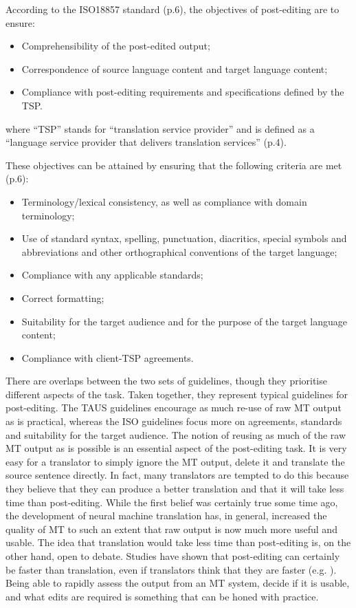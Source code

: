 \documentclass[output=paper,colorlinks,citecolor=brown]{langscibook}
\begin{document}
According to the ISO18857 standard (p.6), the objectives of post-editing are to ensure:

\begin{itemize}
\item Comprehensibility of the post-edited output;
\item Correspondence of source language content and target language content;
\item Compliance with post-editing requirements and specifications defined by the TSP.
\end{itemize}

where “TSP” stands for “translation service provider” and is defined as a “language service provider that delivers translation services” (p.4).

These objectives can be attained by ensuring that the following criteria are met (p.6):

\begin{itemize}
\item Terminology/lexical consistency, as well as compliance with domain terminology;
\item Use of standard syntax, spelling, punctuation, diacritics, special symbols and abbreviations and other orthographical conventions of the target language;
\item Compliance with any applicable standards;
\item Correct formatting;
\item Suitability for the target audience and for the purpose of the target language content;
\item Compliance with client-TSP agreements.
\end{itemize}

There are overlaps between the two sets of guidelines, though they prioritise different aspects of the task. Taken together, they represent typical guidelines for post-editing. The TAUS guidelines encourage as much re-use of raw MT output as is practical, whereas the ISO guidelines focus more on agreements, standards and suitability for the target audience. The notion of reusing as much of the raw MT output as is possible is an essential aspect of the post-editing task. It is very easy for a translator to simply ignore the MT output, delete it and translate the source sentence directly. In fact, many translators are tempted to do this because they believe that they can produce a better translation and that it will take less time than post-editing. While the first belief was certainly true some time ago, the development of neural machine translation has, in general, increased the quality of MT to such an extent that raw output is now much more useful and usable. The idea that translation would take less time than post-editing is, on the other hand, open to debate. Studies have shown that post-editing can certainly be faster than translation, even if translators think that they are faster (e.g. \citealt{GuerberofArenas2014}). Being able to rapidly assess the output from an MT system, decide if it is usable, and what edits are required is something that can be honed with practice. 
\end{document}
